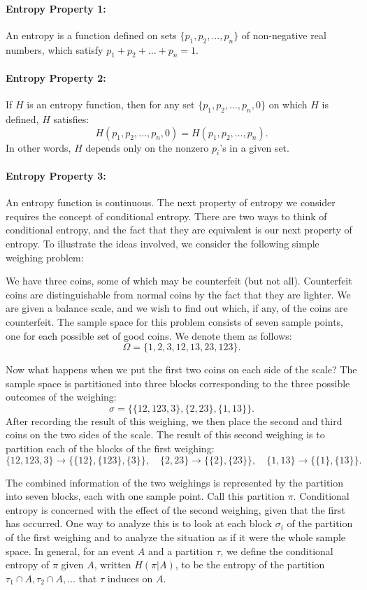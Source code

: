 \documentclass{report}
\begin{document}
\paragraph{Entropy Property 1:} 
An entropy is a function defined on sets \( \{p_1, p_2, \ldots, p_n\} \) of non-negative real numbers, which satisfy \( p_1 + p_2 + \ldots + p_n = 1 \).

\paragraph{Entropy Property 2:} 
If \( H \) is an entropy function, then for any set \( \{p_1, p_2, \ldots, p_n, 0\} \) on which \( H \) is defined, \( H \) satisfies:
\[
H(p_1, p_2, \ldots, p_n, 0) = H(p_1, p_2, \ldots, p_n).
\]
In other words, \( H \) depends only on the nonzero \( p_i \)'s in a given set.

\paragraph{Entropy Property 3:} 
An entropy function is continuous.
The next property of entropy we consider requires the concept of conditional entropy. There are two ways to think of conditional entropy, and the fact that they are equivalent is our next property of entropy. To illustrate the ideas involved, we consider the following simple weighing problem:

We have three coins, some of which may be counterfeit (but not all). Counterfeit coins are distinguishable from normal coins by the fact that they are lighter. We are given a balance scale, and we wish to find out which, if any, of the coins are counterfeit. The sample space for this problem consists of seven sample points, one for each possible set of good coins. We denote them as follows:
\[
\Omega = \{1, 2, 3, 12, 13, 23, 123\}.
\]

Now what happens when we put the first two coins on each side of the scale? The sample space is partitioned into three blocks corresponding to the three possible outcomes of the weighing:
\[
\sigma = \{\{12, 123, 3\}, \{2, 23\}, \{1, 13\}\}.
\]
After recording the result of this weighing, we then place the second and third coins on the two sides of the scale. The result of this second weighing is to partition each of the blocks of the first weighing:
\[
\{12, 123, 3\} \to \{\{12\}, \{123\}, \{3\}\}, \quad 
\{2, 23\} \to \{\{2\}, \{23\}\}, \quad 
\{1, 13\} \to \{\{1\}, \{13\}\}.
\]

The combined information of the two weighings is represented by the partition into seven blocks, each with one sample point. Call this partition \( \pi \). Conditional entropy is concerned with the effect of the second weighing, given that the first has occurred. One way to analyze this is to look at each block \( \sigma_i \) of the partition of the first weighing and to analyze the situation as if it were the whole sample space. In general, for an event \( A \) and a partition \( \tau \), we define the conditional entropy of \( \pi \) given \( A \), written \( H(\pi|A) \), to be the entropy of the partition \( \tau_1 \cap A, \tau_2 \cap A, \ldots \) that \( \tau \) induces on \( A \). 
\end{document}
